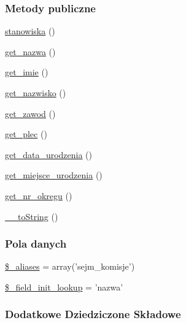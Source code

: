\subsubsection*{Metody publiczne}
\begin{DoxyCompactItemize}
\item 
\hyperlink{classep___sejm___komisja_a9dd4480bf7002df382ab888d880131c2}{stanowiska} ()
\item 
\hyperlink{classep___sejm___komisja_ac0818f0049d7b84f08f77128f54cee36}{get\-\_\-nazwa} ()
\item 
\hyperlink{classep___sejm___komisja_ac4b0c85dc2a130038f2d118dbd0c3d77}{get\-\_\-imie} ()
\item 
\hyperlink{classep___sejm___komisja_abdd1d7ff92508da7f748ba1feec97af0}{get\-\_\-nazwisko} ()
\item 
\hyperlink{classep___sejm___komisja_af80ca8310b60004454dd02a387deaa2c}{get\-\_\-zawod} ()
\item 
\hyperlink{classep___sejm___komisja_ac7f9af5c3fa024e4c26a7b6bd4ce4bb4}{get\-\_\-plec} ()
\item 
\hyperlink{classep___sejm___komisja_a880b240cd2d8c336fd1709bf0cb1ae2c}{get\-\_\-data\-\_\-urodzenia} ()
\item 
\hyperlink{classep___sejm___komisja_ac57c08ec5e394a19c5bd9280c8376182}{get\-\_\-miejsce\-\_\-urodzenia} ()
\item 
\hyperlink{classep___sejm___komisja_a2645a9f0aa5b0ccc482943348c033d0a}{get\-\_\-nr\-\_\-okregu} ()
\item 
\hyperlink{classep___sejm___komisja_a7516ca30af0db3cdbf9a7739b48ce91d}{\-\_\-\-\_\-to\-String} ()
\end{DoxyCompactItemize}
\subsubsection*{Pola danych}
\begin{DoxyCompactItemize}
\item 
\hyperlink{classep___sejm___komisja_ab4e31d75f0bc5d512456911e5d01366b}{\$\-\_\-aliases} = array('sejm\-\_\-komisje')
\item 
\hyperlink{classep___sejm___komisja_a4a4d54ae35428077a7c61ec8a5139af3}{\$\-\_\-field\-\_\-init\-\_\-lookup} = 'nazwa'
\end{DoxyCompactItemize}
\subsubsection*{Dodatkowe Dziedziczone Składowe}


